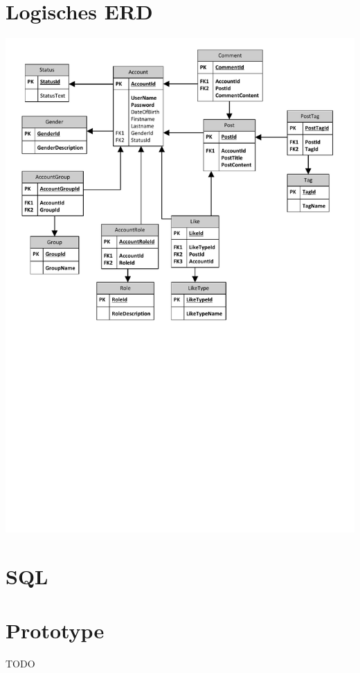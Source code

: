 \documentclass[12pt,twoside,a4paper]{article}
\begin{document}
	\section{Logisches ERD}
	\includegraphics[width=15cm]{erm}
	
	\section{SQL}
	
	
	
	
	\section{Prototype}
	
	TODO
	
	
	
	
\end{document}
